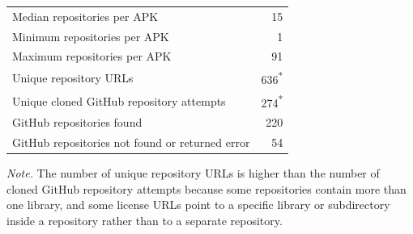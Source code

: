 \documentclass[12pt,a4paper]{report}
\begin{document}
\begin{table}[htbp]
\begin{tabular}{lr}
Median repositories per APK & 15 \\
Minimum repositories per APK & 1 \\
Maximum repositories per APK & 91 \\
Unique repository URLs & 636\textsuperscript{*} \\
Unique cloned GitHub repository attempts & 274\textsuperscript{*} \\
GitHub repositories found & 220 \\
GitHub repositories not found or returned error & 54 \\
\hline
\end{tabular}

{\footnotesize\textit{Note.} The number of unique repository URLs is higher than the number of cloned GitHub repository attempts because some repositories contain more than one library, and some license URLs point to a specific library or subdirectory inside a repository rather than to a separate repository.}
\end{table}
\end{document}
